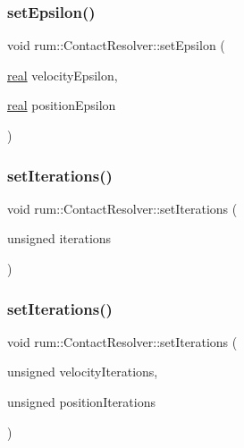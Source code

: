 \mbox{\label{classrum_1_1_contact_resolver_a6dd5b9d5e4057068fd96fff89a607bcc}} 
\subsubsection{\texorpdfstring{set\+Epsilon()}{setEpsilon()}}
{\footnotesize\ttfamily void rum\+::\+Contact\+Resolver\+::set\+Epsilon (\begin{DoxyParamCaption}\item[{\mbox{\hyperlink{namespacerum_a7e8cca23573d5eaead0f138cbaa4862c}{real}}}]{velocity\+Epsilon,  }\item[{\mbox{\hyperlink{namespacerum_a7e8cca23573d5eaead0f138cbaa4862c}{real}}}]{position\+Epsilon }\end{DoxyParamCaption})}

\mbox{\label{classrum_1_1_contact_resolver_a22500b8327332e7c95c100aa30160ff8}} 
\subsubsection{\texorpdfstring{set\+Iterations()}{setIterations()}\hspace{0.1cm}{\footnotesize\ttfamily [1/2]}}
{\footnotesize\ttfamily void rum\+::\+Contact\+Resolver\+::set\+Iterations (\begin{DoxyParamCaption}\item[{unsigned}]{iterations }\end{DoxyParamCaption})}

\mbox{\label{classrum_1_1_contact_resolver_a2dd2bf231348dc011449f43e71087182}} 
\subsubsection{\texorpdfstring{set\+Iterations()}{setIterations()}\hspace{0.1cm}{\footnotesize\ttfamily [2/2]}}
{\footnotesize\ttfamily void rum\+::\+Contact\+Resolver\+::set\+Iterations (\begin{DoxyParamCaption}\item[{unsigned}]{velocity\+Iterations,  }\item[{unsigned}]{position\+Iterations }\end{DoxyParamCaption})}



